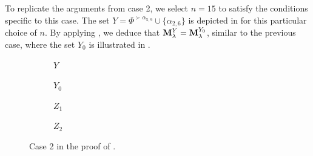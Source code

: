 \begin{example}
\bigskip
To replicate the arguments from case 2, we select $n = 15$ to satisfy the conditions specific to this case. The set $Y = \Phi^{\succ \alpha_{5,9}} \cup \{\alpha_{2,6}\}$ is depicted in  for this particular choice of $n$. 
By applying , we deduce that $\mathbf{M}_{\lambda}^{Y} = \mathbf{M}_{\lambda}^{Y_{0}}$, similar to the previous case, where the set $Y_{0}$ is illustrated in . 

\begin{figure}[H]
     \centering
     \begin{subfigure}[b]{0.22\textwidth}
         \centering
        {}
    \caption{ $Y$  }
    \label{fig: ExaLemma3.10Acase2}
     \end{subfigure}
     \hfill
     \begin{subfigure}[b]{0.22\textwidth}
         \centering
        {}
    \caption{ $Y_{0}$  }
    \label{fig: ExaLemma3.10Bcase2}
     \end{subfigure}
     \hfill
     \begin{subfigure}[b]{0.22\textwidth}
         \centering
        {}
    \caption{$Z_{1}$}
    \label{fig: ExaLemma3.10Ccase2}
     \end{subfigure}
     \hfill
     \begin{subfigure}[b]{0.22\textwidth}
         \centering
        {}
    \caption{$Z_{2}$}
    \label{fig: ExaLemma3.10Dcase2}
     \end{subfigure}
        \caption{Case 2 in the proof of .}
        \label{fig: EJEMPLO Lemma 3.10case2}
\end{figure}


\end{example}
